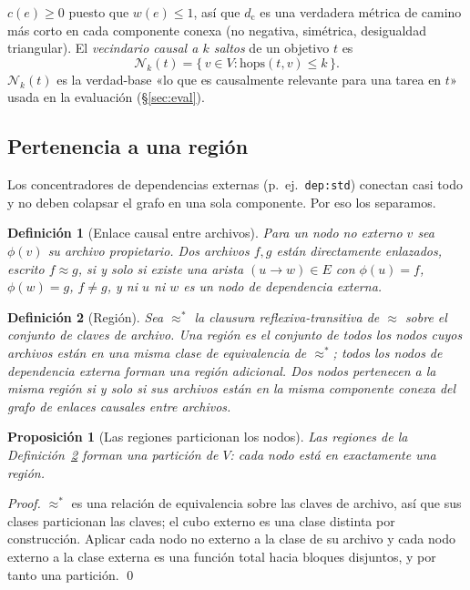 \documentclass[11pt]{article}
\newtheorem{definition}{Definición}
\newtheorem{proposition}{Proposición}
\newcommand{\dcausal}{d_{\mathrm{c}}}
\newcommand{\Nk}{\mathcal{N}_k}
\newcommand{\code}[1]{\texttt{#1}}
\begin{document}
$c(e)\ge 0$ puesto que $w(e)\le 1$, así que $\dcausal$ es una verdadera métrica de
camino más corto en cada componente conexa (no negativa, simétrica, desigualdad
triangular). El \emph{vecindario causal a $k$ saltos} de un objetivo $t$ es
\begin{equation}
\Nk(t) = \{\, v \in V : \mathrm{hops}(t,v) \le k \,\}.
\end{equation}
$\Nk(t)$ es la verdad-base «lo que es causalmente relevante para una tarea en $t$»
usada en la evaluación (\S\ref{sec:eval}).

\subsection{Pertenencia a una región}

Los concentradores de dependencias externas (p.\ ej.\ \code{dep:std}) conectan casi
todo y no deben colapsar el grafo en una sola componente. Por eso los separamos.

\begin{definition}[Enlace causal entre archivos]
Para un nodo no externo $v$ sea $\phi(v)$ su archivo propietario. Dos archivos $f,g$
están \emph{directamente enlazados}, escrito $f \approx g$, si y solo si existe una
arista $(u\!\to\!w)\in E$ con $\phi(u)=f$, $\phi(w)=g$, $f\neq g$, y ni $u$ ni $w$ es
un nodo de dependencia externa.
\end{definition}

\begin{definition}[Región]\label{def:region}
Sea $\approx^{*}$ la clausura reflexiva-transitiva de $\approx$ sobre el conjunto de
claves de archivo. Una \emph{región} es el conjunto de todos los nodos cuyos archivos
están en una misma clase de equivalencia de $\approx^{*}$; todos los nodos de
dependencia externa forman una región adicional. Dos nodos pertenecen a la misma
región si y solo si sus archivos están en la misma componente conexa del grafo de
enlaces causales entre archivos.
\end{definition}

\begin{proposition}[Las regiones particionan los nodos]
Las regiones de la Definición~\ref{def:region} forman una partición de $V$: cada nodo
está en exactamente una región.
\end{proposition}
\begin{proof}
$\approx^{*}$ es una relación de equivalencia sobre las claves de archivo, así que sus
clases particionan las claves; el cubo externo es una clase distinta por construcción.
Aplicar cada nodo no externo a la clase de su archivo y cada nodo externo a la clase
externa es una función total hacia bloques disjuntos, y por tanto una partición. \qed
\end{proof}
\end{document}
